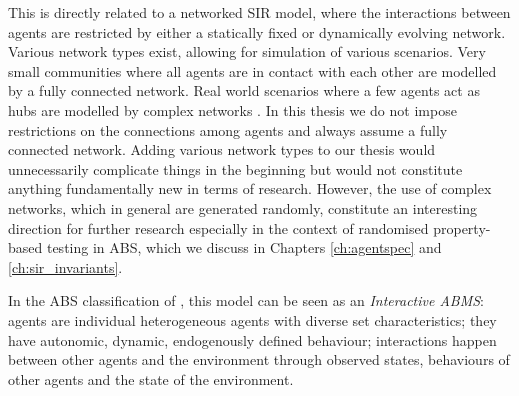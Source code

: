 This is directly related to a networked SIR model, where the interactions between agents are restricted by either a statically fixed or dynamically evolving network. Various network types exist, allowing for simulation of various scenarios. Very small communities where all agents are in contact with each other are modelled by a fully connected network. Real world scenarios where a few agents act as hubs are modelled by complex networks \cite{BarabasiAlbert_EmergenceScaling, Jackson2008, Newman_ComplexNetworks, WattsStrogatz_DynamicsSmallWorld}. In this thesis we do not impose restrictions on the connections among agents and always assume a fully connected network. Adding various network types to our thesis would unnecessarily complicate things in the beginning but would not constitute anything fundamentally new in terms of research. However, the use of complex networks, which in general are generated randomly, constitute an interesting direction for further research especially in the context of randomised property-based testing in ABS, which we discuss in Chapters \ref{ch:agentspec} and \ref{ch:sir_invariants}.

In the ABS classification of \cite{macal_everything_2016}, this model can be seen as an \textit{Interactive ABMS}: agents are individual heterogeneous agents with diverse set characteristics; they have autonomic, dynamic, endogenously defined behaviour; interactions happen between other agents and the environment through observed states, behaviours of other agents and the state of the environment.